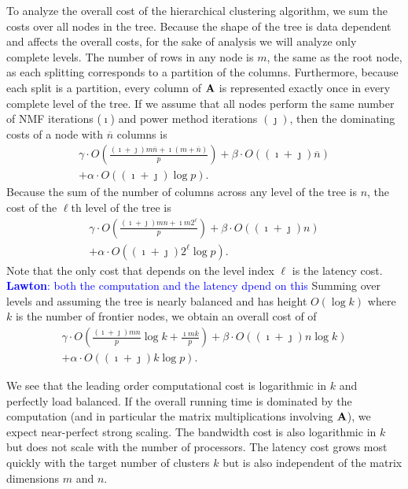\documentclass[conference,compsoc]{IEEEtran}
\newcommand{\LM}[1]{\textcolor{blue}{\textbf{Lawton}: #1}}
\begin{document}
To analyze the overall cost of the hierarchical clustering algorithm, we sum the costs over all nodes in the tree.
Because the shape of the tree is data dependent and affects the overall costs, for the sake of analysis we will analyze only complete levels.
The number of rows in any node is $m$, the same as the root node, as each splitting corresponds to a partition of the columns.
Furthermore, because each split is a partition, every column of $\M{A}$ is represented exactly once in every complete level of the tree.
If we assume that all nodes perform the same number of NMF iterations ($\imath$) and power method iterations $(\jmath)$, then the dominating costs of a node with $\overline{n}$ columns is
\begin{equation*}
\label{eq:nodecost}
\begin{split}
\gamma \cdot O\left( \frac{(\imath+\jmath) m\overline{n} + \imath (m+\overline{n}) }{p} \right) + \beta \cdot O((\imath+\jmath) \overline{n}) \\ + \alpha \cdot O((\imath+\jmath) \log p).
\end{split}
\end{equation*}
Because the sum of the number of columns across any level of the tree is $n$, the cost of the $\ell$th level of the tree is
\begin{equation}
\label{eq:levelcost}
\begin{split}
\gamma \cdot O\left( \frac{(\imath+\jmath) mn + \imath m 2^\ell}{p} \right) + \beta \cdot O((\imath+\jmath) n) \\ + \alpha \cdot O((\imath+\jmath) 2^\ell \log p).
\end{split}
\end{equation}
Note that the only cost that depends on the level index $\ell$ is the latency cost.
\LM{both the computation and the latency dpend on this}
Summing over levels and assuming the tree is nearly balanced and has height $O(\log k)$ where $k$ is the number of frontier nodes, we obtain an overall cost of  of
\begin{equation}
\label{eq:treecost}
\begin{split}
\gamma \cdot O\left( \frac{(\imath+\jmath) mn}{p}  \log k + \frac{\imath mk}{p} \right) + \beta \cdot O((\imath+\jmath) n \log k) \\ + \alpha \cdot O((\imath+\jmath) k \log p).
\end{split}
\end{equation}

We see that the leading order computational cost is logarithmic in $k$ and perfectly load balanced.
If the overall running time is dominated by the computation (and in particular the matrix multiplications involving $\M{A}$), we expect near-perfect strong scaling.
The bandwidth cost is also logarithmic in $k$ but does not scale with the number of processors.
The latency cost grows most quickly with the target number of clusters $k$ but is also independent of the matrix dimensions $m$ and $n$.
\end{document}

